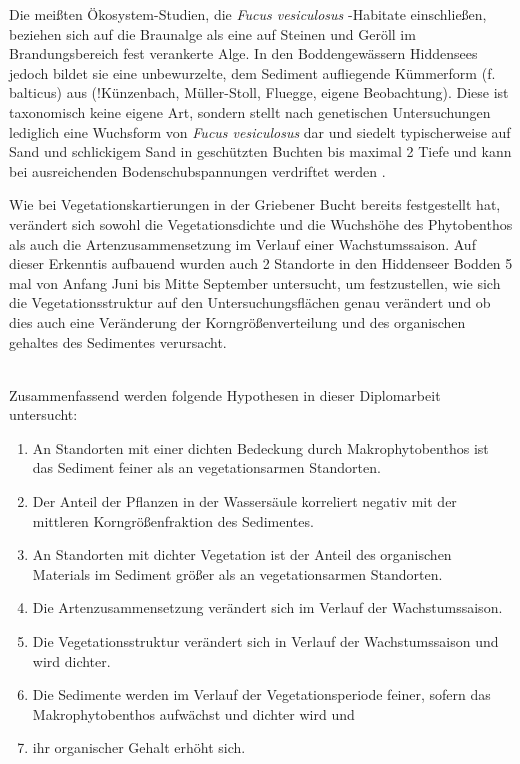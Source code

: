Die meißten Ökosystem-Studien, die \textit{Fucus vesiculosus} -Habitate einschließen, beziehen sich auf die Braunalge als eine auf Steinen und Geröll im Brandungsbereich fest verankerte Alge.
In den Boddengewässern Hiddensees jedoch bildet sie eine unbewurzelte, dem Sediment aufliegende Kümmerform (f. balticus) aus \citep{k}(!Künzenbach, Müller-Stoll, Fluegge, eigene Beobachtung).  Diese ist taxonomisch keine eigene Art, sondern stellt nach genetischen Untersuchungen lediglich eine Wuchsform von \textit{Fucus vesiculosus} dar \citep{athanasiadis_1996} und siedelt typischerweise auf Sand und schlickigem Sand in geschützten Buchten bis maximal \unit{2}{\metre} Tiefe \citep{helcom_red_list_macrophyte_expert_group_2013} und kann bei ausreichenden Bodenschubspannungen verdriftet werden \citep{canal-verges_2010}.

Wie \cite{flugge_2004} bei Vegetationskartierungen in der Griebener Bucht bereits festgestellt hat, verändert sich sowohl die Vegetationsdichte und die Wuchshöhe des Phytobenthos als auch die Artenzusammensetzung im Verlauf einer Wachstumssaison. Auf dieser Erkenntis aufbauend wurden auch 2 Standorte in den Hiddenseer Bodden 5 mal von Anfang Juni bis Mitte September untersucht, um festzustellen, wie sich die Vegetationsstruktur auf den Untersuchungsflächen genau verändert und ob dies auch eine Veränderung der Korngrößenverteilung und des organischen gehaltes des Sedimentes verursacht.

\\
Zusammenfassend werden folgende Hypothesen in dieser Diplomarbeit untersucht: 
\\
\begin{enumerate}[label=\Roman{*},leftmargin=1.5cm]
\item An Standorten mit einer dichten Bedeckung durch Makrophytobenthos ist das Sediment feiner als an vegetationsarmen Standorten.
\item Der Anteil der Pflanzen in der Wassersäule korreliert negativ mit der mittleren Korngrößenfraktion des Sedimentes.
\item An Standorten mit dichter Vegetation ist der Anteil des organischen Materials im Sediment größer als an vegetationsarmen Standorten.
\item Die Artenzusammensetzung verändert sich im Verlauf der Wachstumssaison.
\item Die Vegetationsstruktur verändert sich in Verlauf der Wachstumssaison und wird dichter.
\item Die Sedimente werden im Verlauf der Vegetationsperiode feiner, sofern das Makrophytobenthos aufwächst und dichter wird und 
\item ihr organischer Gehalt erhöht sich.
\end{enumerate}
